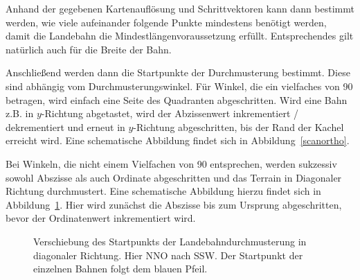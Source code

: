\documentclass[10pt,a4paper]{report}
\begin{document}
Anhand der gegebenen Kartenauflösung und Schrittvektoren kann dann bestimmt werden, wie viele aufeinander folgende Punkte mindestens benötigt werden, damit die Landebahn die Mindestlängenvoraussetzung erfüllt.
Entsprechendes gilt natürlich auch für die Breite der Bahn.

Anschließend werden dann die Startpunkte der Durchmusterung bestimmt.
Diese sind abhängig vom Durchmusterungswinkel. 
Für Winkel, die ein vielfaches von 90 betragen, wird einfach eine Seite des Quadranten abgeschritten. Wird eine Bahn z.B. in $y$-Richtung abgetastet, wird der Abzissenwert inkrementiert / dekrementiert und erneut in $y$-Richtung abgeschritten, bis der Rand der Kachel erreicht wird. Eine schematische Abbildung findet sich in Abbildung~\ref{scanortho}.

Bei Winkeln, die nicht einem Vielfachen von 90 entsprechen, werden sukzessiv sowohl Abszisse als auch Ordinate abgeschritten und das Terrain in Diagonaler Richtung durchmustert. 
Eine schematische Abbildung hierzu findet sich in Abbildung~\ref{scandiagonal}. Hier wird zunächst die Abszisse bis zum Ursprung abgeschritten, bevor der Ordinatenwert inkrementiert wird.

\begin{figure}\label{scandiagonal}
\centering
{}
\caption{Verschiebung des Startpunkts der Landebahndurchmusterung in diagonaler Richtung. Hier NNO nach SSW. Der Startpunkt der einzelnen Bahnen folgt dem blauen Pfeil.}
\end{figure}
\end{document}
